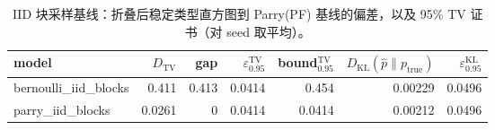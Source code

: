 \begin{table}[H]
\centering
\scriptsize
\setlength{\tabcolsep}{4pt}
\caption{IID 块采样基线：折叠后稳定类型直方图到 Parry(PF) 基线的偏差，以及 95\% TV 证书（对 seed 取平均）。}
\label{tab:iid_sources_fold_vs_parry_ci}
\begin{tabular}{lrrrrrr}
\toprule
model & $D_\mathrm{TV}$ & gap & $\varepsilon^{\mathrm{TV}}_{0.95}$ & bound$^{\mathrm{TV}}_{0.95}$ & $D_\mathrm{KL}(\hat p\|p_{\mathrm{true}})$ & $\varepsilon^{\mathrm{KL}}_{0.95}$\\
\midrule
bernoulli\_iid\_blocks & 0.411 & 0.413 & 0.0414 & 0.454 & 0.00229 & 0.0496\\
parry\_iid\_blocks & 0.0261 & 0 & 0.0414 & 0.0414 & 0.00212 & 0.0496\\
\bottomrule
\end{tabular}
\end{table}
